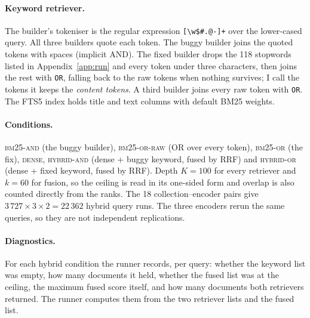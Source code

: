 \documentclass[11pt]{article}
\begin{document}
{\sloppy
\paragraph{Keyword retriever.} The builder's tokeniser is the regular expression \verb|[\w$#.@-]+| over the lower-cased query. All three builders quote each token. The buggy builder joins the quoted tokens with spaces (implicit AND). The fixed builder drops the 118 stopwords listed in Appendix~\ref{app:run} and every token under three characters, then joins the rest with \verb|OR|, falling back to the raw tokens when nothing survives; I call the tokens it keeps the \emph{content tokens}. A third builder joins every raw token with \verb|OR|. The FTS5 index holds title and text columns with default BM25 weights.\par}

{\sloppy
\paragraph{Conditions.} \textsc{bm25-and} (the buggy builder), \textsc{bm25-or-raw} (OR over every token), \textsc{bm25-or} (the fix), \textsc{dense}, \textsc{hybrid-and} (dense + buggy keyword, fused by RRF) and \textsc{hybrid-or} (dense + fixed keyword, fused by RRF). Depth $K = 100$ for every retriever and $k = 60$ for fusion, so the ceiling is read in its one-sided form and overlap is also counted directly from the ranks. The 18 collection--encoder pairs give $3\,727 \times 3 \times 2 = 22\,362$ hybrid query runs. The three encoders rerun the same queries, so they are not independent replications.\par}

\paragraph{Diagnostics.} For each hybrid condition the runner records, per query: whether the keyword list was empty, how many documents it held, whether the fused list was at the ceiling, the maximum fused score itself, and how many documents both retrievers returned. The runner computes them from the two retriever lists and the fused list.
\end{document}
